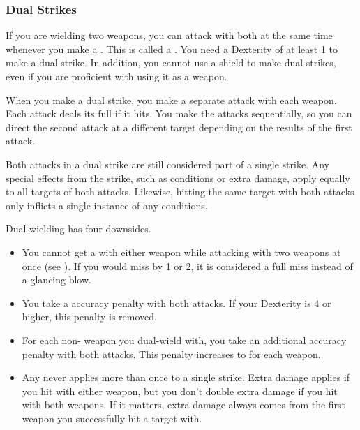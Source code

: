         \subsubsection{Dual Strikes}\label{Dual Strikes}
            If you are wielding two weapons, you can attack with both at the same time whenever you make a .
            This is called a .
            You need a Dexterity of at least 1 to make a dual strike.
            In addition, you cannot use a shield to make dual strikes, even if you are proficient with using it as a weapon.

            When you make a dual strike, you make a separate attack with each weapon.
            Each attack deals its full  if it hits.
            You make the attacks sequentially, so you can direct the second attack at a different target depending on the results of the first attack.

            Both attacks in a dual strike are still considered part of a single strike.
            Any special effects from the strike, such as conditions or extra damage, apply equally to all targets of both attacks.
            Likewise, hitting the same target with both attacks only inflicts a single instance of any conditions.

            Dual-wielding has four downsides.
            \begin{itemize}
                \item You cannot get a  with either weapon while attacking with two weapons at once (see ).
                    If you would miss by 1 or 2, it is considered a full miss instead of a glancing blow.
                \item You take a  accuracy penalty with both attacks.
                    If your Dexterity is 4 or higher, this penalty is removed.
                \item For each non- weapon you dual-wield with, you take an additional  accuracy penalty with both attacks.
                    This penalty increases to  for each  weapon.
                \item Any  never applies more than once to a single strike.
                    Extra damage applies if you hit with either weapon, but you don't double extra damage if you hit with both weapons.
                    If it matters, extra damage always comes from the first weapon you successfully hit a target with.
            \end{itemize}

